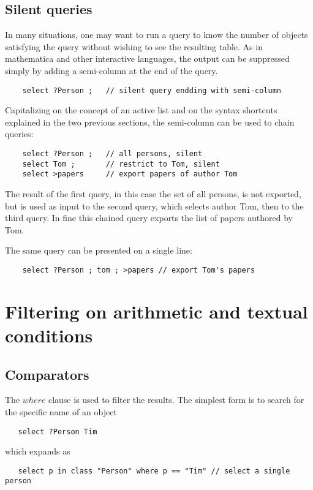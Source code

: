 \documentclass[11pt]{article}
\newcommand{\BL}{\begin{lstlisting}}
\begin{document}
%%%%%%%%%%%%%%%%%%%%%%%%%%%%%%%%%%%%%%%%%%%%%%%%%%%%%%%%%%%%%%%%
% SECTION
%%%%%%%%%%%%%%%%%%%%%%%%%%%%%%%%%%%%%%%%%%%%%%%%%%%%%%%%%%%%%%%%
\subsection{Silent queries}

In many situations, one may want to run a query to know the number 
of objects satisfying the query without wishing to
see the resulting table. As in mathematica and other interactive
languages, the output can be suppressed simply by adding 
a semi-column at the end of the query.
\BL
    select ?Person ;   // silent query endding with semi-column
\end{lstlisting}

Capitalizing on the concept of an active list
and on the syntax shortcuts explained in the two previous sections,
the semi-column can be used to chain queries:
\BL
    select ?Person ;   // all persons, silent
    select Tom ;       // restrict to Tom, silent
    select >papers     // export papers of author Tom
\end{lstlisting}
The result of the first query, in this case the set of all persons,
is not exported, but is used as input to the second query,
which selects author Tom, then to the third query. In fine
this chained query exports the list of papers authored by Tom.

The same query can be presented on a single line:
\BL
    select ?Person ; tom ; >papers // export Tom's papers
\end{lstlisting}


\section{Filtering on arithmetic and textual conditions}
\subsection{Comparators}

The $where$ clause is used to filter the results. The simplest form is to search for the specific name of an object
\BL
   select ?Person Tim
\end{lstlisting}
which expands as
\BL
   select p in class "Person" where p == "Tim" // select a single person
\end{lstlisting}
\end{document}
